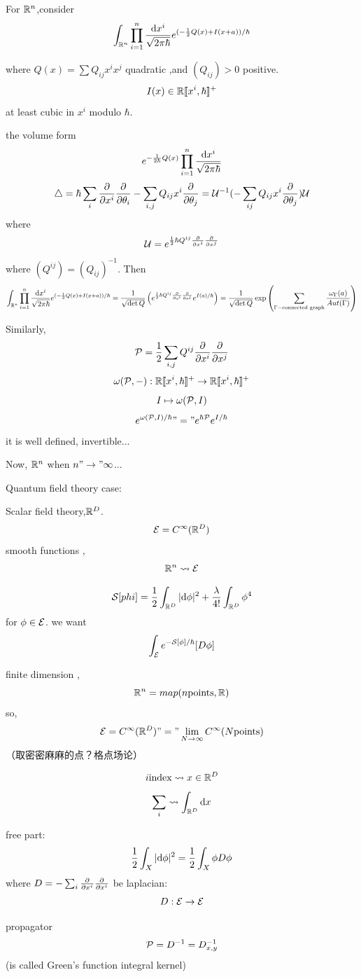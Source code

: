For $\mathbb{R}^n$,consider 
$$\int_{\mathbb{R}^n}\prod_{i=1}^n\frac{\mathrm{d} x^i}{\sqrt{2\pi\hbar}}
e^{(-\frac{1}{2}Q(x)+I(x+a))/\hbar}$$

where $Q(x)=\sum Q_{ij}x^ix^j$ quadratic ,and $(Q_{ij})>0$ positive.
$$I(x)\in\mathbb{R}[\![x^i,\hbar]\!]^+$$
at least cubic in $x^i$ modulo $\hbar$.

the volume form 
$$e^{-\frac{1}{2\hbar}Q(x)}\prod_{i=1}^n\frac{\mathrm{d} x^i}{\sqrt{2\pi\hbar}}$$
$$\triangle=\hbar\sum_i\frac{\partial } {\partial x^i}\frac{\partial } {\partial \theta_i}-\sum_{i,j}Q_{ij}x^i\frac{\partial } {\partial \theta_j}
=\mathcal{U}^{-1}(-\sum_{ij}Q_{ij}x^i\frac{\partial } {\partial \theta_j})\mathcal{U}$$
where 
$$\mathcal{U}=e^{\frac{1}{2}\hbar Q^{ij}\frac{\partial } {\partial x^i}\frac{\partial } {\partial x^j}}$$
where $(Q^{ij})=(Q_{ij})^{-1}$. Then
$$\int_{\mathbb{R}^n}\prod_{i=1}^n\frac{\mathrm{d} x^i}{\sqrt{2\pi\hbar}}
e^{(-\frac{1}{2}Q(x)+I(x+a))/\hbar}
=\frac{1}{\sqrt{\det Q}}
  \left(
    e^{\frac{1}{2}\hbar Q^{ij}\frac{\partial } {\partial a^i}\frac{\partial } {\partial a^j}}e^{I(a)/\hbar}
  \right)
=
  \frac{1}{\sqrt{\det Q}}
  \exp\left(
    \sum_{\Gamma-\text{connected graph}}
      \frac{\omega_\Gamma(a)}{Aut(\Gamma)}
  \right)
$$

Similarly, 
$$\mathcal{P}=\frac{1}{2}\sum_{i,j}Q^{ij}\frac{\partial } {\partial x^i}\frac{\partial } {\partial x^j}$$
$$\omega(\mathcal{P},-):\mathbb{R}[\![x^i,\hbar]\!]^+\to\mathbb{R}[\![x^i,\hbar]\!]^+$$
$$I\mapsto \omega(\mathcal{P},I)$$
$$e^{\omega(\mathcal{P},I)/\hbar}"="e^{\hbar\mathcal{P}}e^{I/\hbar}$$
it is well defined, invertible...

Now, $\mathbb{R}^n$ when $n"\to"\infty$...

Quantum field theory case:

\begin{example}Scalar field theory,$\mathbb{R}^D$.
$$\mathcal{E}=C^{\infty}(\mathbb{R}^D)$$
smooth functions ,
$$\mathbb{R}^n\rightsquigarrow\mathcal{E}$$

$$\mathcal{S}[phi]=\frac{1}{2}
\int_{\mathbb{R}^D}
  |\mathrm{d}\phi|^2
 +\frac{\lambda}{4!}
  \int_{\mathbb{R}^D}\phi^4
$$
for $\phi\in\mathcal{E}$. we want 
$$\int_{\mathcal{E}}e^{-\mathcal{S}[\phi]/\hbar}[D\phi]$$
\end{example}

finite dimension ,
$$\mathbb{R}^n=map(n \text{points},\mathbb{R})$$
so,
$$\mathcal{E}=C^{\infty}(\mathbb{R}^D)"="\lim_{N\to\infty}C^{\infty}(N \text{points})$$
（取密密麻麻的点？格点场论）

$$i \text{index}\rightsquigarrow x\in\mathbb{R}^D$$
$$\sum_i\rightsquigarrow\int_{\mathbb{R}^D}\mathrm{d} x$$

free part: 
$$\frac{1}{2}\int_X|\mathrm{d}\phi|^2
=\frac{1}{2}\int_X\phi D\phi
$$
where $D=-\sum_i\frac{\partial } {\partial x^i}\frac{\partial } {\partial x^i}$ be laplacian:
$$D:\mathcal{E}\to\mathcal{E}$$

propagator                        
$$\mathcal{P}=D^{-1}=D^{-1}_{x,y}$$
(is called Green's function integral kernel)

